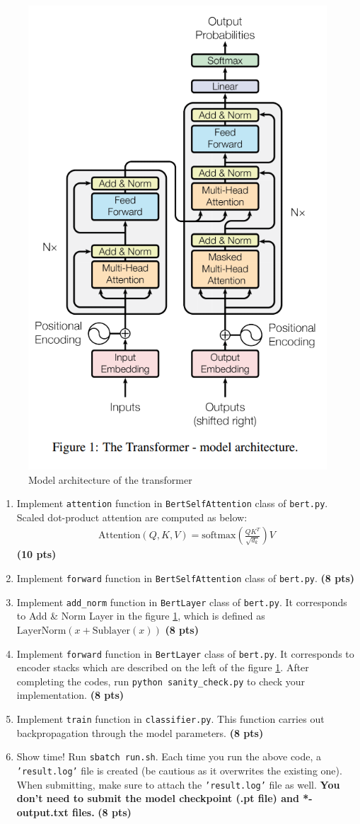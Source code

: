 \documentclass{assignment format}
\begin{document}
\begin{figure}[h]
\centering
\captionsetup{justification=centering,margin=2cm}
\includegraphics[width=0.35\linewidth]{transformer.png}
\caption{Model architecture of the transformer}
\label{transformer}
\end{figure}
\begin{enumerate}[label=(\alph*)]

    \item Implement \texttt{attention} function in \texttt{BertSelfAttention} class of \texttt{bert.py}. Scaled dot-product attention are computed as below: 
        \begin{align}
\text{Attention}(Q,K,V) = \text{softmax}(\frac{QK^T}{\sqrt{d_k}})V
\end{align} \textbf{(10 pts)}
    \item Implement \texttt{forward} function in \texttt{BertSelfAttention} class of \texttt{bert.py}. \textbf{(8 pts)}
    \item Implement \texttt{add\_norm} function in \texttt{BertLayer} class of \texttt{bert.py}. It corresponds to Add \& Norm Layer in the figure \ref{transformer}, which is defined as $\text{LayerNorm}(x+\text{Sublayer}(x))$ \textbf{(8 pts)}

    \item  Implement \texttt{forward} function in \texttt{BertLayer} class of \texttt{bert.py}. It corresponds to encoder stacks which are described on the left of the figure \ref{transformer}. After completing the codes, run \texttt{python sanity\_check.py} to check your implementation. \textbf{(8 pts)}
  \item  Implement \texttt{train} function in \texttt{classifier.py}. This function carries out backpropagation through the model parameters. \textbf{(8 pts)}
  
   \item Show time! Run \texttt{sbatch run.sh}. Each time you run the above code, a \texttt{'result.log'} file is created (be cautious as it overwrites the existing one). When submitting, make sure to attach the \texttt{'result.log'} file as well. \textbf{You don't need to submit the model checkpoint (.pt file) and *-output.txt files.} \textbf{(8 pts)} 
\end{enumerate}
\end{document}
